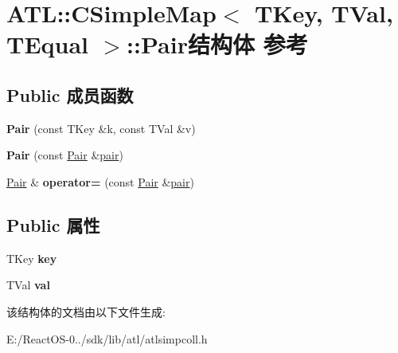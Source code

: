 \hypertarget{struct_a_t_l_1_1_c_simple_map_1_1_pair}{}\section{A\+TL\+:\+:C\+Simple\+Map$<$ T\+Key, T\+Val, T\+Equal $>$\+:\+:Pair结构体 参考}
\label{struct_a_t_l_1_1_c_simple_map_1_1_pair}
\subsection*{Public 成员函数}
\begin{DoxyCompactItemize}
\item 
\mbox{\label{struct_a_t_l_1_1_c_simple_map_1_1_pair_a60ee2b376aa177b3d8180518b23ed721}} 
{\bfseries Pair} (const T\+Key \&k, const T\+Val \&v)
\item 
\mbox{\label{struct_a_t_l_1_1_c_simple_map_1_1_pair_a43ef7d2035ec4e1958dc589df26c2053}} 
{\bfseries Pair} (const \hyperlink{struct_a_t_l_1_1_c_simple_map_1_1_pair}{Pair} \&\hyperlink{structpair}{pair})
\item 
\mbox{\label{struct_a_t_l_1_1_c_simple_map_1_1_pair_ad47102f0a96d2e60b289ea287765fb23}} 
\hyperlink{struct_a_t_l_1_1_c_simple_map_1_1_pair}{Pair} \& {\bfseries operator=} (const \hyperlink{struct_a_t_l_1_1_c_simple_map_1_1_pair}{Pair} \&\hyperlink{structpair}{pair})
\end{DoxyCompactItemize}
\subsection*{Public 属性}
\begin{DoxyCompactItemize}
\item 
\mbox{\label{struct_a_t_l_1_1_c_simple_map_1_1_pair_a9a5f178a758f887fe37bcd320330d6e8}} 
T\+Key {\bfseries key}
\item 
\mbox{\label{struct_a_t_l_1_1_c_simple_map_1_1_pair_ae510b3edfbbf2608d263da956f1aeea3}} 
T\+Val {\bfseries val}
\end{DoxyCompactItemize}


该结构体的文档由以下文件生成\+:\begin{DoxyCompactItemize}
\item 
E\+:/\+React\+O\+S-\/0../sdk/lib/atl/atlsimpcoll.\+h\end{DoxyCompactItemize}
